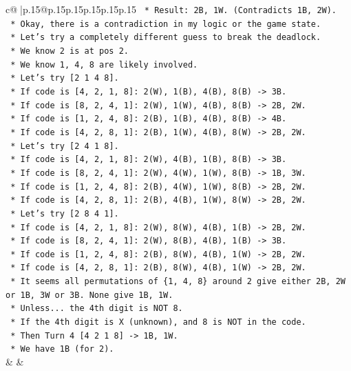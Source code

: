 \documentclass{article}
\begin{document}
{\begin{supertabular}{c@{$\;$}|p{.15\linewidth}@{}p{.15\linewidth}p{.15\linewidth}p{.15\linewidth}p{.15\linewidth}p{.15\linewidth}}
{{{\texttt{                *   Result: 2B, 1W. (Contradicts 1B, 2W).} \\
\texttt{    *   Okay, there is a contradiction in my logic or the game state.} \\
\texttt{    *   Let's try a completely different guess to break the deadlock.} \\
\texttt{    *   We know 2 is at pos 2.} \\
\texttt{    *   We know 1, 4, 8 are likely involved.} \\
\texttt{    *   Let's try {[}2 1 4 8{]}.} \\
\texttt{        *   If code is {[}4, 2, 1, 8{]}: 2(W), 1(B), 4(B), 8(B) {-}> 3B.} \\
\texttt{        *   If code is {[}8, 2, 4, 1{]}: 2(W), 1(W), 4(B), 8(B) {-}> 2B, 2W.} \\
\texttt{        *   If code is {[}1, 2, 4, 8{]}: 2(B), 1(B), 4(B), 8(B) {-}> 4B.} \\
\texttt{        *   If code is {[}4, 2, 8, 1{]}: 2(B), 1(W), 4(B), 8(W) {-}> 2B, 2W.} \\
\texttt{    *   Let's try {[}2 4 1 8{]}.} \\
\texttt{        *   If code is {[}4, 2, 1, 8{]}: 2(W), 4(B), 1(B), 8(B) {-}> 3B.} \\
\texttt{        *   If code is {[}8, 2, 4, 1{]}: 2(W), 4(W), 1(W), 8(B) {-}> 1B, 3W.} \\
\texttt{        *   If code is {[}1, 2, 4, 8{]}: 2(B), 4(W), 1(W), 8(B) {-}> 2B, 2W.} \\
\texttt{        *   If code is {[}4, 2, 8, 1{]}: 2(B), 4(B), 1(W), 8(W) {-}> 2B, 2W.} \\
\texttt{    *   Let's try {[}2 8 4 1{]}.} \\
\texttt{        *   If code is {[}4, 2, 1, 8{]}: 2(W), 8(W), 4(B), 1(B) {-}> 2B, 2W.} \\
\texttt{        *   If code is {[}8, 2, 4, 1{]}: 2(W), 8(B), 4(B), 1(B) {-}> 3B.} \\
\texttt{        *   If code is {[}1, 2, 4, 8{]}: 2(B), 8(W), 4(B), 1(W) {-}> 2B, 2W.} \\
\texttt{        *   If code is {[}4, 2, 8, 1{]}: 2(B), 8(W), 4(B), 1(W) {-}> 2B, 2W.} \\
\texttt{    *   It seems all permutations of \{1, 4, 8\} around 2 give either 2B, 2W or 1B, 3W or 3B. None give 1B, 1W.} \\
\texttt{    *   Unless... the 4th digit is NOT 8.} \\
\texttt{    *   If the 4th digit is X (unknown), and 8 is NOT in the code.} \\
\texttt{    *   Then Turn 4 {[}4 2 1 8{]} {-}> 1B, 1W.} \\
\texttt{    *   We have 1B (for 2).} \\
            }
        }
    }
    & & \\ \\


\end{supertabular}}
\end{document}

